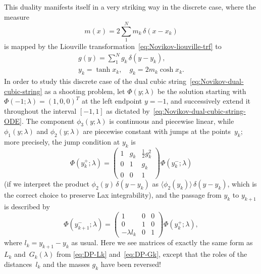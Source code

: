 \documentclass[10pt,a4paper]{article} \pdfoutput=1 
\begin{document}
This duality manifests itself in a very striking way in the discrete case,
where the measure
\begin{equation*}
  m(x) = 2 \sum_1^N m_k \, \delta(x-x_k)
\end{equation*}
is mapped by the Liouville transformation~\eqref{eq:Novikov-liouville-trf} to
\begin{equation}
  \begin{gathered}
    g(y) = \sum_1^N g_k \, \delta(y-y_k)
    , \\
    y_k = \tanh x_k
    ,\quad
    g_k = 2 m_k \cosh x_k
    .
  \end{gathered}
\end{equation}
In order to study this discrete case of the dual cubic
string~\eqref{eq:Novikov-dual-cubic-string} as a shooting problem,
let $\Phi(y;\lambda)$ be the solution starting with $\Phi(-1;\lambda) = (1,0,0)^T$
at the left endpoint $y=-1$,
and successively extend it throughout the interval $[-1,1]$ as dictated
by~\eqref{eq:Novikov-dual-cubic-string-ODE}.
The component $\phi_3(y;\lambda)$ is continuous and piecewise linear,
while $\phi_1(y;\lambda)$ and $\phi_2(y;\lambda)$ are piecewise constant with jumps at the points~$y_k$;
more precisely, the jump condition at $y_k$ is
\begin{equation}
  \label{eq:Novikov-Gk}
  \Phi(y_k^+;\lambda) =
  \begin{pmatrix}
    1 & g_k & \frac12 g_k^2 \\ 0 & 1 & g_k \\ 0 & 0 & 1
  \end{pmatrix}
  \Phi(y_k^-;\lambda)
\end{equation}
(if we interpret the product $\phi_2(y) \, \delta(y-y_k)$ as
$\langle \phi_2(y_k) \rangle \, \delta(y-y_k)$,
which is the correct choice to preserve Lax integrability),
and the passage from $y_k$ to $y_{k+1}$ is described by
\begin{equation}
  \label{eq:Novikov-Lk}
  \Phi(y_{k+1}^-;\lambda) =
  \begin{pmatrix}
    1 & 0 & 0 \\ 0 & 1 & 0 \\ -\lambda l_k & 0 & 1
  \end{pmatrix}
  \Phi(y_k^+;\lambda)
  ,
\end{equation}
where $l_k = y_{k+1} - y_k$ as usual.
Here we see matrices of exactly the same form as $L_k$ and~$G_k(\lambda)$
from \eqref{eq:DP-Lk} and~\eqref{eq:DP-Gk},
except that the roles of the distances~$l_k$ and the masses $g_k$
have been reversed!
\end{document}
